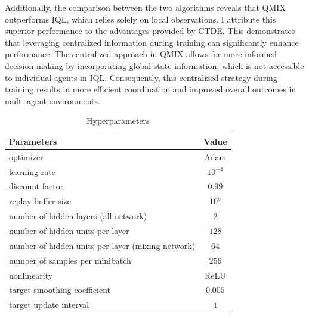 \documentclass{article}
\begin{document}
Additionally, the comparison between the two algorithms reveals that QMIX outperforms IQL, which relies solely on local observations. I attribute this superior performance to the advantages provided by CTDE. This demonstrates that leveraging centralized information during training can significantly enhance performance. The centralized approach in QMIX allows for more informed decision-making by incorporating global state information, which is not accessible to individual agents in IQL. Consequently, this centralized strategy during training results in more efficient coordination and improved overall outcomes in multi-agent environments.

\begin{table}[htb]
    \caption{Hyperparameters}\label{parameters}
\begin{tabular}[c]{|l|c|}
    \hline
    \textbf{Parameters} & \textbf{Value}\\
    \hline
    optimizer &  Adam \\
    \hline
    learning rate & $10^{-4}$\\
    \hline
    discount factor & $0.99$\\
    \hline
    replay buffer size & $10^6$\\
    \hline
    number of hidden layers (all network) & $2$\\
    \hline
    number of hidden units per layer & $128$\\
    \hline
    number of hidden units per layer (mixing network) & $64$\\
    \hline
    number of samples per minibatch & $256$\\
    \hline
    nonlinearity & ReLU\\
    \hline
    target smoothing coefficient & $0.005$\\
    \hline
    target update interval & $1$\\
    \hline
\end{tabular}\centering
\end{table}

{
\small


}
\end{document}
